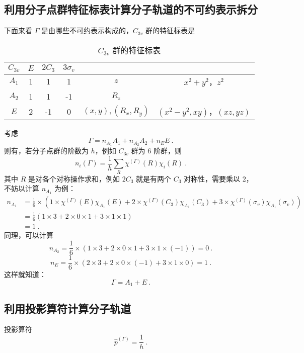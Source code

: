 \subsection{利用分子点群特征标表计算分子轨道的不可约表示拆分}
下面来看 $\Gamma$ 是由哪些不可约表示构成的，$C_{3v}$ 群的特征标表是
\begin{table}[ht]
\centering
\caption{$C_{3v}$ 群的特征标表}\label{tab_SALCs2}
\begin{tabular}{|c|c|c|c|c|c|}
\hline
$C_{3v}$ & $E$ & $2C_3$ & $3\sigma_v$ &  &  \\
\hline
$A_1$ & 1 & 1 & 1 & $z$ & $x^2+y^2$，$z^2$ \\
\hline
$A_2$ & 1 & 1 & -1 & $R_z$ &  \\
\hline
$E$ & 2 & -1 & 0 & $(x, y), (R_x, R_y)$ & $(x^2-y^2, xy)$，$(xz,yz)$ \\
\hline
\end{tabular}
\end{table}
考虑
\begin{equation}
\Gamma = n_{A_1} A_1 + n_{A_2} A_2 + n_{E} E ~.
\end{equation}
则有，若分子点群的阶数为 $h$，例如 $C_{3v}$ 群为 $6$ 阶群，则 
\begin{equation}
n_i(\Gamma) = \frac{1}{h} \sum_R \chi^{(\Gamma)}(R) \chi_i(R) ~.
\end{equation}
其中 $R$ 是对各个对称操作求和，例如 $2C_3$ 就是有两个 $C_3$ 对称性，需要乘以 $2$，不妨以计算 $n_{A_1}$ 为例：
\begin{equation}
\begin{aligned}
n_{A_1} &= \frac{1}{6} \times (1 \times \chi^{(\Gamma)}(E)\chi_{A_1}(E) + 2 \times\chi^{(\Gamma)}(C_3)\chi_{A_1}(C_3)+3\times\chi^{(\Gamma)}(\sigma_v)\chi_{A_1}(\sigma_v)   ) \\
&=\frac{1}{6} (1 \times 3 + 2 \times 0 \times 1 + 3 \times 1 \times 1 )\\
& = 1 ~.
\end{aligned}
\end{equation}
同理，可以计算 
\begin{equation}
n_{A_2} = \frac{1}{6} \times (1 \times 3 + 2 \times 0 \times 1+ 3 \times 1 \times (-1)) = 0 ~.
\end{equation}
\begin{equation}
n_{E} = \frac{1}{6} \times (2 \times 3 + 2 \times 0 \times (-1) + 3 \times 1 \times 0) = 1 ~.
\end{equation}
这样就知道：
$$\Gamma = A_1 + E ~.$$
\subsection{利用投影算符计算分子轨道}
投影算符
$$\hat{p}^{(\Gamma)} = \frac{1}{h} ~.$$